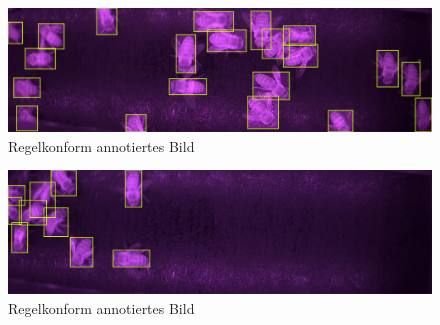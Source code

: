 \documentclass[11pt,a4paper]{article}
\begin{document}
\begin{figure}[!htb] \label{annotated2}
    \centering
	    \includegraphics[width = .8\textwidth]{images/annotated2.png}
        \caption{Regelkonform annotiertes Bild}
\end{figure}

\begin{figure}[!htb] \label{annotated3}
    \centering
	    \includegraphics[width = .8\textwidth]{images/annotated3.png}
        \caption{Regelkonform annotiertes Bild}
\end{figure}
\newpage
\end{document}
